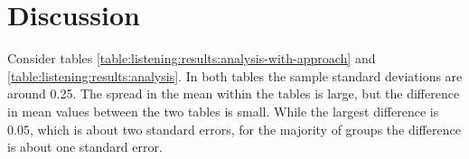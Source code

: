 %
%
%


%
%

\newpage
\section{Discussion}
Consider tables \ref{table:listening:results:analysis-with-approach} and
\ref{table:listening:results:analysis}. In both tables the sample
standard deviations are around 0.25. The spread in the mean within the tables is
large, but the difference in mean values between the two tables is small. While
the largest difference is 0.05, which is about two standard errors, for the
majority of groups the difference is about one standard error.

